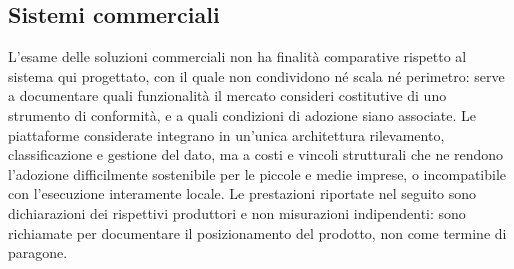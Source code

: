 \subsection{Sistemi commerciali}
\label{sub:sistemi-commerciali}
L'esame delle soluzioni commerciali non ha finalità comparative rispetto al sistema qui progettato, con il quale non condividono né scala né perimetro: serve a documentare quali funzionalità il mercato consideri costitutive di uno strumento di conformità, e a quali condizioni di adozione siano associate. Le piattaforme considerate integrano in un'unica architettura rilevamento, classificazione e gestione del dato, ma a costi e vincoli strutturali che ne rendono l'adozione difficilmente sostenibile per le piccole e medie imprese, o incompatibile con l'esecuzione interamente locale. Le prestazioni riportate nel seguito sono dichiarazioni dei rispettivi produttori e non misurazioni indipendenti: sono richiamate per documentare il posizionamento del prodotto, non come termine di paragone.

